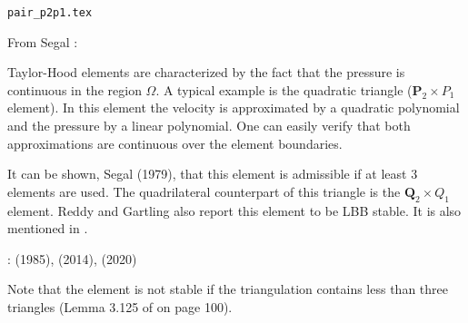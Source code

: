 \begin{flushright} {\tiny {\color{gray} \tt pair\_p2p1.tex}} \end{flushright}

\noindent
\begin{minipage}{0.54\textwidth}
From Segal \cite{segal}: 
\begin{displayquote}
{\color{darkgray}
Taylor-Hood elements \cite{taho73} 
are characterized by the fact that the pressure is continuous in the region $\Omega$. 
A typical example is the quadratic triangle (${\bm P}_2\times P_1$ element).
In this element the velocity is approximated by a quadratic polynomial and the pressure by a
linear polynomial. One can easily verify that both approximations are continuous over 
the element boundaries.}
\end{displayquote}

It can be shown, Segal (1979), that this element is admissible if at least 3 elements 
are used. The quadrilateral counterpart of this triangle is the ${\bm Q}_2\times Q_1$ element.
Reddy and Gartling \cite[p179]{reddybook2} also report this element to be LBB stable.
It is also mentioned in \textcite{nath93}.

\Literature: \textcite{scan85} (1985), \textcite{lejx14} (2014), \textcite{cump20} (2020)
\end{minipage}
\hfill
\begin{minipage}{0.42\textwidth}
\begin{center}

\end{center}
\end{minipage}

Note that the element is not stable if the triangulation contains less than three triangles
(Lemma 3.125 of \cite{john16} on page 100).


